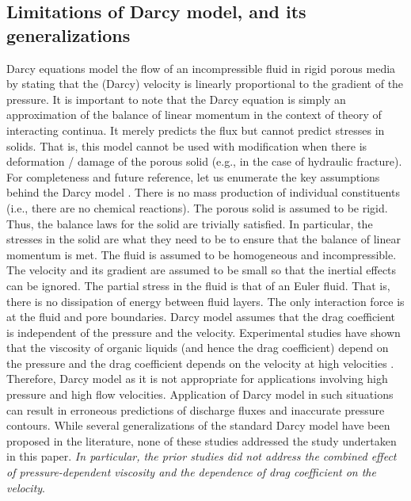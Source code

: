 \documentclass[11pt,reqno]{amsart}
\begin{document}
\subsection{Limitations of Darcy model, and its generalizations}
Darcy equations model the flow of an incompressible 
fluid in rigid porous media by stating that the 
(Darcy) velocity is linearly proportional to the 
gradient of the pressure. 
It is important to note that the Darcy equation is 
simply an approximation of the balance of linear 
momentum in the context of theory of interacting 
continua. It merely predicts the flux but cannot 
predict stresses in solids. That is, this model 
cannot be used with modification when there is 
deformation / damage of the porous solid (e.g., 
in the case of hydraulic fracture). For completeness 
and future reference, let us enumerate the key 
assumptions behind the Darcy model 
\cite{Nakshatrala_Rajagopal_IJNMF_2011_v67_p342}. 
 There is no mass production of individual 
constituents (i.e., there are no chemical reactions). 
 The porous solid is assumed to be rigid. 
Thus, the balance laws for the solid are 
trivially satisfied. In particular, the 
stresses in the solid are what they need 
to be to ensure that the balance of linear 
momentum is met. 
 The fluid is assumed to be homogeneous 
and incompressible.
 The velocity and its gradient are 
assumed to be small so that the inertial 
effects can be ignored.
 The partial stress in the fluid is 
that of an Euler fluid. That is, there is no 
dissipation of energy between fluid layers.
 The only interaction force is at 
the fluid and pore boundaries.
 Darcy model assumes that the drag 
coefficient is independent of the pressure 
and the velocity. 
Experimental studies have shown that the 
viscosity of organic liquids (and hence the 
drag coefficient) depend on the pressure 
\cite{Bridgman,CarlBarus} and the drag 
coefficient depends on the velocity at 
high velocities \cite{Forchheimer_1901_v45_p1782,JacobBear}. 
Therefore, Darcy model as it is not appropriate 
for applications involving high pressure and 
high flow velocities. Application of Darcy 
model in such situations can result in 
erroneous predictions of discharge fluxes 
and inaccurate pressure contours. 
While several generalizations of the standard Darcy 
model have been proposed in the literature, none of 
these studies addressed the study undertaken in this 
paper. \emph{In particular, the prior studies did not 
address the combined effect of pressure-dependent 
viscosity and the dependence of drag coefficient 
on the velocity}. 
\end{document}
